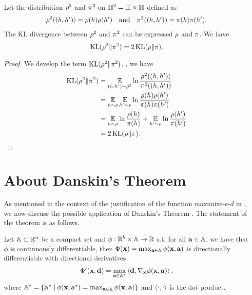 \begin{noaddcontents}
\begin{lemma}\label{ap:mv:lemma:kl}
Let the distribution $\Q^2$ and $\P^2$ on $\H^2=\H\times\H$ defined as
\begin{align*}
    \Q^2((\h,\h')) = \Q(\h)\Q(\h') \quad\text{and}\quad \P^2((\h, \h'))=\P(\h)\P(\h').
\end{align*}
The KL divergence between $\Q^2$ and $\P^2$ can be expressed \wrt $\Q$ and $\P$.
We have
\begin{align*}
    \KL(\Q^2\|\P^2) = 2\KL(\Q\|\P).
\end{align*}
\end{lemma}
\begin{proof}
We develop the term $\KL(\Q^2\|\P^2)$, \ie, we have
\begin{align*}
    \KL(\Q^2\|\P^2) &= \EE_{(\h,\h')\sim\Q^2}\ln\frac{\Q^2((\h,\h'))}{\P^2((\h,\h'))}\\
    &= \EE_{\h\sim\Q}\EE_{\h'\sim\Q}\ln\frac{\Q(\h)\Q(\h')}{\P(\h)\P(\h')}\\
    &= \EE_{\h\sim\Q}\ln\frac{\Q(\h)}{\P(\h)} + \EE_{\h'\sim\Q}\ln\frac{\Q(\h')}{\P(\h')}\\
    &= 2\KL(\Q\|\P).
\end{align*}
\end{proof}

\section{About Danskin's Theorem}
\label{ap:mv:sec:danskin}

As mentioned in the context of the justification of the function {\sc maximize-$e$-$d$} in , we now discuss the possible application of Danskin's Theorem \citep[Section I]{Danskin1966}. 
The statement of the theorem is as follows.

\begin{theorem}
Let $\Abb\subset \R^a$ be a compact set and $\phi:\R^b\times \Abb\rightarrow \R$ s.t. for all $\abf\in\Abb$, we have that $\phi$ is continuously differentiable, then $\Phi(\xbf) = \max_{\abf\in\Abb}\phi(\xbf, \abf)$ is directionally differentiable with  directional derivatives
\begin{align*}
    \Phi'(\xbf, \dbf) = \max_{\abf\in\Abb^*}\LA\dbf, \nabla_{\xbf}\phi(\xbf, \abf)\RA,
\end{align*}
where $\Abb^*=\LC \abf^* \;\middle|\; \phi(\xbf, \abf^*)=\max_{\abf\in\Abb}\phi(\xbf, \abf)\RC$ and $\LA\cdot,\cdot\RA$ is the dot product.
\label{theorem:danskin}
\end{theorem}


\end{noaddcontents}
